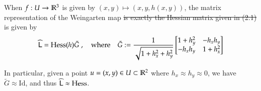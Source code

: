         	\begin{theorem}
	        	When $f: U \to \mathbb{R}^3$ is given by $(x,y) \mapsto (x, y, h(x,y))$, the matrix
	        	representation of the Weingarten map \sout{is exactly the Hessian matrix given in (2.1)} is given by
	        	\begin{equation} \label{weinmatexactgraph}
	        	\widehat{\mathsf{L}} = \mathrm{Hess}(h) \tilde{G} \;,\quad \mathrm{where} \quad
		        	\tilde{G} := \frac{1}{\sqrt{1+h_x^2 + h_y^2}}
		        	\begin{bmatrix}
			        	1 + h_y^2 & -h_x h_y \\
			        	-h_x h_y & 1 + h_x^2 \\
		        	\end{bmatrix} 
	        	\end{equation}
	        	
	        	In particular, given a point $u = (x,y) \in U \subset \mathbb{R}^2$ where $h_x \approx h_y \approx 0$, we
	        	have $\tilde{G} \approx \mathrm{Id}$, and thus $\widehat{\mathsf{L}} \approx \mathrm{Hess}$.
        	\end{theorem}
